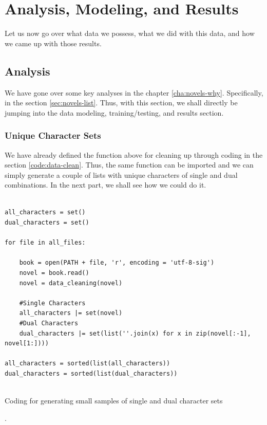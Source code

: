 \chapter{Analysis, Modeling, and Results} %
\label{cha:data} %

Let us now go over what data we possess, what we did with this data, and how we came up with those results. 


\section{Analysis}
\label{sec:analysis}

We have gone over some key analyses in the chapter \ref{cha:novels-why}. Specifically, in the section \ref{sec:novels-list}. Thus, with this section, we shall directly be jumping into the data modeling, training/testing, and results section.

\subsection{Unique Character Sets}
\label{sec:unique-character-sets}

We have already defined the function above for cleaning up through coding in the section \ref{code:data-clean}. Thus, the same function can be imported and we can simply generate a couple of lists with unique characters of single and dual combinations. In the next part, we shall see how we could do it. 
\vspace{0.5cm}

\begin{code}
\label{code:data-split}
\begin{verbatim}

all_characters = set()
dual_characters = set()

for file in all_files:
    
    book = open(PATH + file, 'r', encoding = 'utf-8-sig')
    novel = book.read()
    novel = data_cleaning(novel)

    #Single Characters
    all_characters |= set(novel)
    #Dual Characters
    dual_characters |= set(list(''.join(x) for x in zip(novel[:-1], novel[1:])))  

all_characters = sorted(list(all_characters))
dual_characters = sorted(list(dual_characters))
    
\end{verbatim}
\caption{Coding for generating small samples of single and dual character sets}.
\end{code}

